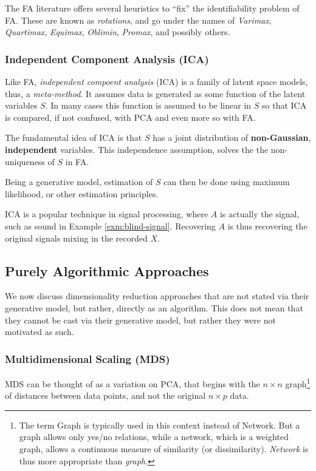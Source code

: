 \documentclass[]{book}
\theoremstyle{definition}
\theoremstyle{definition}
\theoremstyle{definition}
\theoremstyle{remark}
\begin{document}
The FA literature offers several heuristics to ``fix'' the
identifiability problem of FA. These are known as \emph{rotations}, and
go under the names of \emph{Varimax}, \emph{Quartimax}, \emph{Equimax},
\emph{Oblimin}, \emph{Promax}, and possibly others.

\subsubsection{Independent Component Analysis
(ICA)}\label{independent-component-analysis-ica}

Like FA, \emph{independent compoent analysis} (ICA) is a family of
latent space models, thus, a \emph{meta-method}. It assumes data is
generated as some function of the latent variables \(S\). In many cases
this function is assumed to be linear in \(S\) so that ICA is compared,
if not confused, with PCA and even more so with FA.

The fundamental idea of ICA is that \(S\) has a joint distribution of
\textbf{non-Gaussian}, \textbf{independent} variables. This independence
assumption, solves the the non-uniqueness of \(S\) in FA.

Being a generative model, estimation of \(S\) can then be done using
maximum likelihood, or other estimation principles.

ICA is a popular technique in signal processing, where \(A\) is actually
the signal, such as sound in Example \ref{exm:blind-signal}. Recovering
\(A\) is thus recovering the original signals mixing in the recorded
\(X\).

\subsection{Purely Algorithmic
Approaches}\label{purely-algorithmic-approaches}

We now discuss dimensionality reduction approaches that are not stated
via their generative model, but rather, directly as an algorithm. This
does not mean that they cannot be cast via their generative model, but
rather they were not motivated as such.

\subsubsection{Multidimensional Scaling
(MDS)}\label{multidimensional-scaling-mds}

MDS can be thought of as a variation on PCA, that begins with the
\(n \times n\) graph\footnote{The term Graph is typically used in this
  context instead of Network. But a graph allows only yes/no relations,
  while a network, which is a weighted graph, allows a continuous
  measure of similarity (or dissimilarity). \emph{Network} is thus more
  appropriate than \emph{graph}.} of distances between data points, and
not the original \(n \times p\) data.
\end{document}
